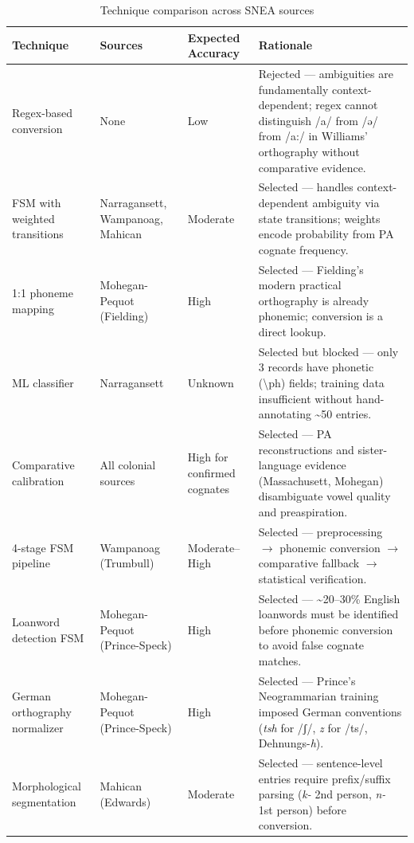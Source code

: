 \begin{table}[ht]
\centering
\caption{Technique comparison across SNEA sources}
\label{tab:techniques}
\small
\begin{tabular}{lp{3cm}p{2.5cm}p{4.5cm}}
\toprule
\textbf{Technique} & \textbf{Sources} & \textbf{Expected Accuracy} & \textbf{Rationale} \\
\midrule
Regex-based conversion & None & Low &
Rejected --- ambiguities are fundamentally context-dependent; regex cannot
distinguish /a/ from /ə/ from /a:/ in Williams' orthography without
comparative evidence. \\
\midrule
FSM with weighted transitions & Narragansett, Wampanoag, Mahican & Moderate &
Selected --- handles context-dependent ambiguity via state transitions;
weights encode probability from PA cognate frequency. \\
\midrule
1:1 phoneme mapping & Mohegan-Pequot (Fielding) & High &
Selected --- Fielding's modern practical orthography is already phonemic;
conversion is a direct lookup. \\
\midrule
ML classifier & Narragansett & Unknown &
Selected but blocked --- only 3 records have phonetic (\textbackslash ph)
fields; training data insufficient without hand-annotating \textasciitilde50
entries. \\
\midrule
Comparative calibration & All colonial sources & High for confirmed cognates &
Selected --- PA reconstructions and sister-language evidence (Massachusett,
Mohegan) disambiguate vowel quality and preaspiration. \\
\midrule
4-stage FSM pipeline & Wampanoag (Trumbull) & Moderate--High &
Selected --- preprocessing $\rightarrow$ phonemic conversion $\rightarrow$
comparative fallback $\rightarrow$ statistical verification. \\
\midrule
Loanword detection FSM & Mohegan-Pequot (Prince-Speck) & High &
Selected --- \textasciitilde20--30\% English loanwords must be identified
before phonemic conversion to avoid false cognate matches. \\
\midrule
German orthography normalizer & Mohegan-Pequot (Prince-Speck) & High &
Selected --- Prince's Neogrammarian training imposed German conventions
(\textit{tsh} for /ʃ/, \textit{z} for /ts/, Dehnungs-\textit{h}). \\
\midrule
Morphological segmentation & Mahican (Edwards) & Moderate &
Selected --- sentence-level entries require prefix/suffix parsing
(\textit{k-} 2nd person, \textit{n-} 1st person) before conversion. \\
\bottomrule
\end{tabular}
\end{table}

